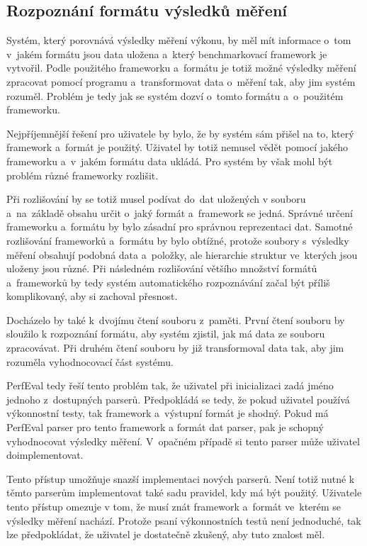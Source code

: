 \subsection{Rozpoznání formátu výsledků měření}

Systém, který porovnává výsledky měření výkonu, by měl mít informace o~tom v~jakém formátu jsou data uložena
a~který benchmarkovací framework je vytvořil. Podle použitého frameworku a~formátu je totiž možné výsledky
měření zpracovat pomocí programu a~transformovat data o~měření tak, aby jim systém rozuměl.
Problém je tedy jak se systém dozví o~tomto formátu a~o~použitém frameworku.

Nejpříjemnější řešení pro uživatele by bylo, že by systém sám přišel na to, který framework a~formát je použitý.
Uživatel by totiž nemusel vědět pomocí jakého frameworku a~v~jakém formátu data ukládá. Pro systém by však mohl
být problém různé frameworky rozlišit.

Při rozlišování by se totiž musel podívat do~dat uložených v souboru
a~na~základě obsahu určit o~jaký formát a~framework se jedná. Správné určení frameworku a~formátu by bylo zásadní pro
správnou reprezentaci dat. Samotné rozlišování frameworků a~formátu by bylo obtížné, protože soubory s~výsledky
měření obsahují podobná data a~položky, ale hierarchie struktur ve~kterých jsou uloženy jsou různé.
Při následném rozlišování většího množství formátů a~frameworků by tedy systém automatického rozpoznávání
začal být příliš komplikovaný, aby si zachoval přesnost.

Docházelo by také k~dvojímu čtení souboru z~paměti. První čtení souboru by sloužilo k rozpoznání formátu,
aby systém zjistil, jak má data ze souboru zpracovávat. Při druhém čtení souboru by již transformoval data
tak, aby jim rozuměla vyhodnocovací část systému.

PerfEval tedy řeší tento problém tak, že uživatel při inicializaci zadá jméno jednoho z~dostupných parserů.
Předpokládá se tedy, že pokud uživatel používá výkonnostní testy, tak framework a~výstupní formát je shodný.
Pokud má PerfEval parser pro tento framework a formát dat parser, pak je schopný vyhodnocovat výsledky měření.
V~opačném případě si tento parser může uživatel doimplementovat.

Tento přístup umožňuje snazší implementaci nových parserů. Není totiž nutné k těmto parserům implementovat
také sadu pravidel, kdy má být použitý. Uživatele tento přístup omezuje v tom, že musí znát framework a~formát
ve~kterém se výsledky měření nachází. Protože psaní výkonnostních testů není jednoduché, tak lze předpokládat,
že uživatel je dostatečně zkušený, aby tuto znalost měl.

